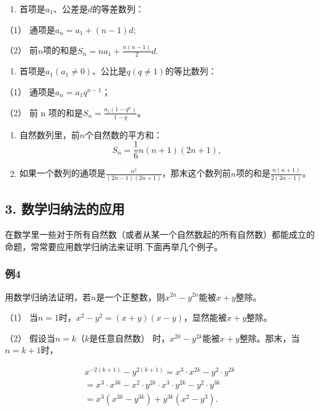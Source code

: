 \begin{enumerate}[start=7]
\item
  首项是\(a_{1}\)、公差是\(d\)的等差数列：
\end{enumerate}

（1） 通项是\(a_{n} = a_{1} + (n - 1)d;\)

（2） 前\(n\)项的和是\(S_{n} = na_{1} + \frac{n(n - 1)}{2} d.\)

\begin{enumerate}[start=8]
\item
  首项是\(a_{1}(a_{1} \neq 0)\)、公比是\(q(q \neq 1)\)的等比数列：
\end{enumerate}

（1） 通项是\(a_{n} = a_{1}q^{n - 1}\)；

（2） 前 n 项的和是\(S_{n}=\frac{a_{1}(1-q^{n})}{1-q}\)。

\begin{enumerate}[start=9]
\item
  自然数列里，前\(n\)个自然数的平方和：
\[
S_{n} = \frac{1}{6} n (n + 1) (2 n + 1),
\]
\item
  如果一个数列的通项是\(\frac{n^2}{(2n - 1)(2n + 1)}\)，那末这个数列前\(n\)项的和是\(\frac{n(n + 1)}{2(2n - 1)}\)。
\end{enumerate}

\subsection{3. 数学归纳法的应用}

在数学里一些对于所有自然数（或者从某一个自然数起的所有自然数）都能成立的命题，常常要应用数学归纳法来证明.下面再举几个例子。

\subsubsection{例4}

用数学归纳法证明，若\(n\)是一个正整数，则\(x^{2n} - y^{2n}\)能被\(x + y\)整除。

 （1）
当\(n = 1\)时，\(x^{2} - y^{2} = (x + y)(x - y)\)，显然能被\(x + y\)整除。

（2） 假设当\(n = k\)（\(k\)是任意自然数）
时，\(x^{2k} - y^{2k}\)能被\(x + y\)整除。那末，当\(n = k + 1\)时，

\[
\begin{array}{l} x^{- 2 (k + 1)} - y^{2 (k + 1)} = x^{3} \cdot x^{2 k} - y^{2} \cdot y^{2 k} \\ = x^{3} \cdot x^{3 k} - x^{2} \cdot y^{2 k} \cdot x^{3} \cdot y^{2 k} - y^{2} \cdot y^{3 k} \\ = x^{3} \left(x^{3 k} - y^{3 k}\right) + y^{3 k} \left(x^{2} - y^{3}\right). \\ \end{array}
\]

